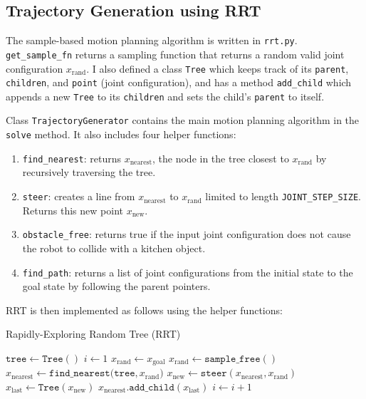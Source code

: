 \documentclass{article}
\begin{document}
\subsection{Trajectory Generation using RRT}
\label{sec:rrt}

The sample-based motion planning algorithm is written in \texttt{rrt.py}. \texttt{get\_sample\_fn} returns a sampling function that returns a random valid joint configuration $x_\text{rand}$. I also defined a class \texttt{Tree} which keeps track of its \texttt{parent}, \texttt{children}, and \texttt{point} (joint configuration), and has a method \texttt{add\_child} which appends a new \texttt{Tree} to its \texttt{children} and sets the child's \texttt{parent} to itself. 

Class \texttt{TrajectoryGenerator} contains the main motion planning algorithm in the \texttt{solve} method. It also includes four helper functions:
\begin{enumerate}
    \item \texttt{find\_nearest}: returns $x_\text{nearest}$, the node in the tree closest to $x_\text{rand}$ by recursively traversing the tree.
    \item \texttt{steer}: creates a line from $x_\text{nearest}$ to $x_\text{rand}$ limited to length \texttt{JOINT\_STEP\_SIZE}. Returns this new point $x_\text{new}$.
    \item \texttt{obstacle\_free}: returns true if the input joint configuration does not cause the robot to collide with a kitchen object.
    \item \texttt{find\_path}: returns a list of joint configurations from the initial state to the goal state by following the parent pointers.
\end{enumerate}

RRT is then implemented as follows using the helper functions:
\begin{algorithm}
\caption{Rapidly-Exploring Random Tree (RRT)}\label{alg:rrt}
\begin{algorithmic}
\State $\mathtt{tree} \gets \mathtt{Tree()}$
\State $i \gets 1$
        \State $x_\text{rand} \gets x_\text{goal}$
    \Else
        \State $x_\text{rand} \gets \mathtt{sample\_free()}$
    \EndIf
    \State $x_\text{nearest} \gets \mathtt{find\_nearest(tree}, x_\text{rand})$
    \State $x_\text{new} \gets \mathtt{steer}(x_\text{nearest}, x_\text{rand})$
    \State $x_\text{last} \gets \mathtt{Tree}(x_\text{new})$
        \State $x_\text{nearest}\mathtt{.add\_child}(x_\text{last})$
            \State {}
        \EndIf 
        \State $i \gets i + 1$
    \EndIf 
\EndWhile
\end{algorithmic}
\end{algorithm}
\end{document}
